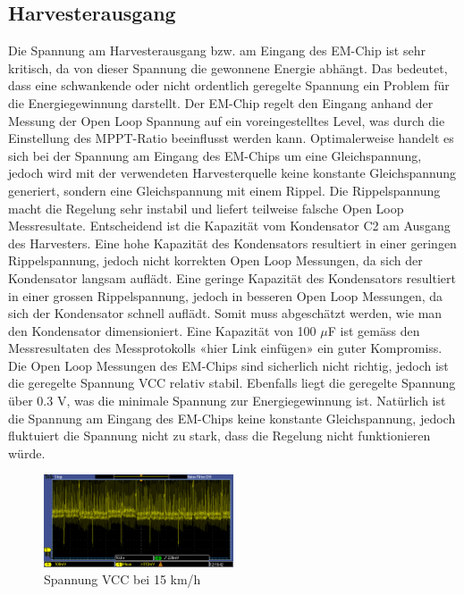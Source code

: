 \subsection{Harvesterausgang}

Die Spannung am Harvesterausgang bzw. am Eingang des EM-Chip ist sehr kritisch, da von dieser Spannung die gewonnene Energie abhängt. Das bedeutet, dass eine schwankende oder nicht ordentlich geregelte Spannung ein Problem für die Energiegewinnung darstellt. 
Der EM-Chip regelt den Eingang anhand der Messung der Open Loop Spannung auf ein voreingestelltes Level, was durch die Einstellung des MPPT-Ratio beeinflusst werden kann. Optimalerweise handelt es sich bei der Spannung am Eingang des EM-Chips um eine Gleichspannung, jedoch wird mit der verwendeten Harvesterquelle keine konstante Gleichspannung generiert, sondern eine Gleichspannung mit einem Rippel. Die Rippelspannung macht die Regelung sehr instabil und liefert teilweise falsche Open Loop Messresultate. 
Entscheidend ist die Kapazität vom Kondensator C2 am Ausgang des Harvesters. Eine hohe Kapazität des Kondensators resultiert in einer geringen Rippelspannung, jedoch nicht korrekten Open Loop Messungen, da sich der Kondensator langsam auflädt. Eine geringe Kapazität des Kondensators resultiert in einer grossen Rippelspannung, jedoch in besseren Open Loop Messungen, da sich der Kondensator schnell auflädt. Somit muss abgeschätzt werden, wie man den Kondensator dimensioniert.
Eine Kapazität von 100 $\mu$F ist gemäss den Messresultaten des Messprotokolls «hier Link einfügen» ein guter Kompromiss. Die Open Loop Messungen des EM-Chips sind sicherlich nicht richtig, jedoch ist die geregelte Spannung VCC relativ stabil. Ebenfalls liegt die geregelte Spannung über 0.3 V, was die minimale Spannung zur Energiegewinnung ist. Natürlich ist die Spannung am Eingang des EM-Chips keine konstante Gleichspannung, jedoch fluktuiert die Spannung nicht zu stark, dass die Regelung nicht funktionieren würde.

\begin{figure}[ht]
\includegraphics[width=0.5\textwidth]{4Resultate/imag/SpannungVCC.png} 
\caption{Spannung VCC bei 15 km/h }
\end{figure}

